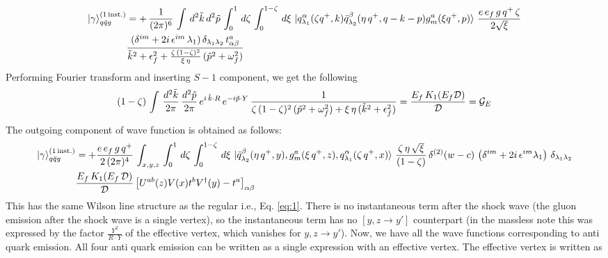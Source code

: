 \documentclass[9pt]{article}
\numberwithin{equation}{section}
\begin{document}
\begin{enumerate}
\begin{align}
\ket{\gamma}^{(1\,\text{inst.})}_{q\Bar{q}g} & = +\,\frac{1}{(2\pi)^{6}}\, \int\, d^{2}\Tilde{k}\, d^{2}\Tilde{p}\, \int_{0}^{1}\, d\zeta\, \int_{0}^{1-\zeta}\, d\xi\,\ket{q^{\alpha}_{\lambda_{1}}(\zeta q^{+},k)\Bar{q}^{\beta}_{\lambda_{2}}(\eta\,q^{+},q-k-p)g^{a}_{m}(\xi q^{+},p)}\, \frac{e\,e_{f}\,g\,q^{+}\,\zeta}{2\sqrt{\xi}}\notag \\ & \frac{(\delta^{im} +2i\,\epsilon^{im}\,\lambda_{1})\,\delta_{\lambda_{1}\lambda_{2}}\,t^{a}_{\alpha\beta}}{\Tilde{k}^{2}+\epsilon^{2}_{f}+\frac{\zeta\,(1-\zeta)^{2}}{\xi\,\eta}\,(\Tilde{p}^{2} +\omega^{2}_{f})}
\end{align}
Performing Fourier transform and inserting $S-1$ component, we get the following
\begin{align}
    (1-\zeta)\, \int\, \frac{d^{2}\Tilde{k}}{2\pi}\, \frac{d^{2}\Tilde{p}}{2\pi}\, e^{i\,\Tilde{k}\cdot R}\, e^{-i\Tilde{p}\cdot Y}\, \frac{1}{\zeta\, (1-\zeta)^{2}\,(\Tilde{p}^{2}+\omega^{2}_{f}) + \xi\,\eta\,(\Tilde{k}^{2}+\epsilon^{2}_{f})} = \frac{E_{f}\,K_{1}(E_{f}\mathcal{D})}{\mathcal{D}} = \mathcal{G}_{E}
\end{align}
The outgoing component of wave function is obtained as follows:  
\begin{align}
\ket{\gamma}^{(1\,\text{inst.})}_{q\Bar{q}g} & = +\frac{e\,e_{f}\,g\,q^{+}}{2\,(2\pi)^{4}}\, \int_{x,y,z}\, \int_{0}^{1}\, d\zeta\, \int_{0}^{1-\zeta}\, d\xi\, \ket{\Bar{q}^{\beta}_{\lambda_{2}}(\eta\,q^{+},y),g^{a}_{m}(\xi\,q^{+},z),q^{\alpha}_{\lambda_{1}}(\zeta\,q^{+},x)}\, \frac{\zeta\,\eta\, \sqrt{\xi}}{(1-\zeta)}\, \delta^{(2)}(w-c)\, \left(\delta^{im}+2i\,\epsilon^{im}\lambda_{1}\right)\,\delta_{\lambda_{1}\lambda_{2}}\notag \\ & \frac{E_{f}\,K_{1}(E_{f}\,\mathcal{D})}{\mathcal{D}} \left[U^{ab}(z)V(x)t^{b}V^{\dagger}(y)-t^{a}\right]_{\alpha\beta}
\end{align}
This has the same Wilson line structure as the regular i.e., Eq. \eqref{eq:1}. There is no instantaneous term after the shock wave (the gluon emission after the shock wave is a single vertex), so the instantaneous term has no $[y,z\rightarrow y']$ counterpart (in the massless note this was expressed by the factor $\frac{Y^{2}}{R\cdot Y}$ of the effective vertex, which vanishes for $y,z\rightarrow y'$). Now, we have all the wave functions corresponding to anti quark emission. All four anti quark emission can be written as a single expression with an effective vertex. The effective vertex is written as
\begin{align}

\end{align}
\end{enumerate}
\end{document}
